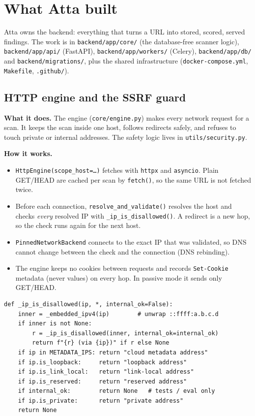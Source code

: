

\maketitlepage
\tableofcontents
\clearpage


\clearpage

\section{What Atta built}
Atta owns the backend: everything that turns a URL into stored, scored, served
findings. The work is in \texttt{backend/app/core/} (the database-free scanner
logic), \texttt{backend/app/api/} (FastAPI), \texttt{backend/app/workers/}
(Celery), \texttt{backend/app/db/} and \texttt{backend/migrations/}, plus the
shared infrastructure (\texttt{docker-compose.yml}, \texttt{Makefile},
\texttt{.github/}).

\subsection{HTTP engine and the SSRF guard}
\textbf{What it does.} The engine (\texttt{core/engine.py}) makes every network
request for a scan. It keeps the scan inside one host, follows redirects safely,
and refuses to touch private or internal addresses. The safety logic lives in
\texttt{utils/security.py}.

\textbf{How it works.}
\begin{itemize}
\item \texttt{HttpEngine(scope\_host=\dots)} fetches with \texttt{httpx} and
\texttt{asyncio}. Plain GET/HEAD are cached per scan by \texttt{fetch()}, so the
same URL is not fetched twice.
\item Before each connection, \texttt{resolve\_and\_validate()} resolves the host
and checks \emph{every} resolved IP with \texttt{\_ip\_is\_disallowed()}. A
redirect is a new hop, so the check runs again for the next host.
\item \texttt{PinnedNetworkBackend} connects to the exact IP that was validated,
so DNS cannot change between the check and the connection (DNS rebinding).
\item The engine keeps no cookies between requests and records \texttt{Set-Cookie}
metadata (never values) on every hop. In passive mode it sends only GET/HEAD.
\end{itemize}

\begin{lstlisting}[style=py,caption={SSRF block list on the resolved IP (\texttt{utils/security.py}).}]
def _ip_is_disallowed(ip, *, internal_ok=False):
    inner = _embedded_ipv4(ip)        # unwrap ::ffff:a.b.c.d
    if inner is not None:
        r = _ip_is_disallowed(inner, internal_ok=internal_ok)
        return f"{r} (via {ip})" if r else None
    if ip in METADATA_IPS: return "cloud metadata address"
    if ip.is_loopback:     return "loopback address"
    if ip.is_link_local:   return "link-local address"
    if ip.is_reserved:     return "reserved address"
    if internal_ok:        return None   # tests / eval only
    if ip.is_private:      return "private address"
    return None
\end{lstlisting}

